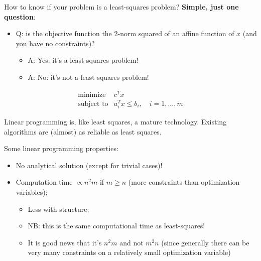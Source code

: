How to know if your problem is a least-squares problem? \textbf{Simple, just one question}:

\begin{itemize}
	\item Q: is the objective function the 2-norm squared of an affine function of $x$ (and you have no constraints)?
	\begin{itemize}
		\item A: Yes: it's a least-squares problem!
		\item A: No: it's not a least squares problem!
	\end{itemize}
\end{itemize}


\begin{Definition}
	$$
	\begin{array}{rl}
	\text{minimize} & c^Tx \\
	\text{subject to} & a_i^Tx\le b_i,\quad i=1,\ldots,m
	\end{array}
	$$
\end{Definition}


Linear programming is, like least squares, a mature technology. Existing algorithms are (almost) as reliable as least squares.

\begin{Fact}
	Some linear programming properties:
	
	\begin{itemize}
		\item No analytical solution (except for trivial cases)!
		\item Computation time $\propto n^2m$ if $m\ge n$ (more constraints than optimization variables);
		\begin{itemize}
			\item Less with structure;
			\item NB: this is the same computational time as least-squares!
			\item It is good news that it's $n^2m$ and not $m^2n$ (since generally there can be very many constraints on a relatively small optimization variable)
		\end{itemize}
	\end{itemize}
\end{Fact}






